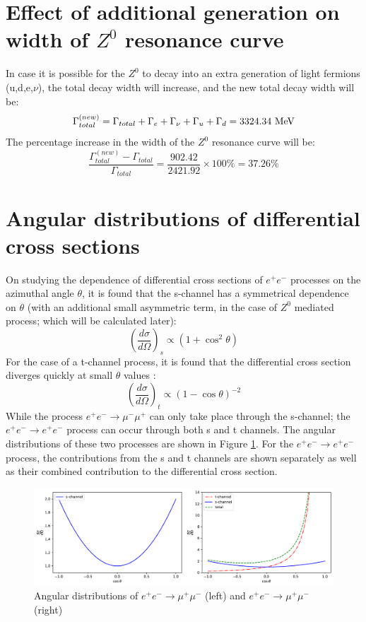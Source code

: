\section{Effect of additional generation on width of $Z^{0}$ resonance curve}
In case it is possible for the $Z^{0}$ to decay into an extra generation of light fermions (u,d,e,$\nu$), the total decay width will increase, and the new total decay width will be: $$\Gamma_{total}^{(new)}=\Gamma_{total}+\Gamma_{e}+\Gamma_{\nu}+\Gamma_{u}+\Gamma_{d}=3324.34 \ \rm{MeV}$$
The percentage increase in the width of the $Z^{0}$ resonance curve will be: $$\dfrac{\Gamma_{total}^{(new)}-\Gamma_{total}}{\Gamma_{total}}=\dfrac{902.42}{2421.92}\times 100 \% = 37.26 \%$$

\section{Angular distributions of differential cross sections}
On studying the dependence of differential cross sections of $e^{+}e^{-}$ processes on the azimuthal angle $\theta$, it is found that the s-channel has a symmetrical dependence on $\theta$ (with an additional small asymmetric term, in the case of $Z^{0}$ mediated process; which will be calculated later): 
\begin{equation}
\left(\dfrac{d\sigma}{d\Omega}\right)_{s}\propto \left(1+\cos^{2}\theta\right)
\end{equation} 
For the case of a t-channel process, it is found that the differential cross section diverges quickly at small $\theta$ values \cite{UB}:
\begin{equation}
\left(\dfrac{d\sigma}{d\Omega}\right)_{t}\propto \left(1-\cos\theta\right)^{-2}
\end{equation}
While the process $e^{+}e^{-}\rightarrow \mu^{-}\mu^{+}$ can only take place through the s-channel; the $e^{+}e^{-}\rightarrow e^{+}e^{-}$ process can occur through both s and t channels. The angular distributions of these two processes are shown in Figure \ref{angdist}. For the $e^{+}e^{-}\rightarrow e^{+}e^{-}$ process, the contributions from the s and t channels are shown separately as well as their combined contribution to the differential cross section.
\begin{figure}[h]
\includegraphics[width=\textwidth]{angulardist.pdf}
\caption{Angular distributions of $e^{+}e^{-}\rightarrow \mu^{+}\mu^{-}$ (left) and $e^{+}e^{-}\rightarrow \mu^{+}\mu^{-}$ (right)}
\label{angdist}
\end{figure}

